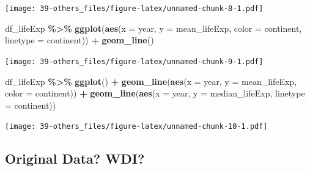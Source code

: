 \documentclass[
  xelatex, ja=standard]{bxjsbook}
\newenvironment{Shaded}{\begin{snugshade}}{\end{snugshade}}
\newcommand{\AttributeTok}[1]{\textcolor[rgb]{0.13,0.29,0.53}{#1}}
\newcommand{\FunctionTok}[1]{\textcolor[rgb]{0.13,0.29,0.53}{\textbf{#1}}}
\newcommand{\NormalTok}[1]{#1}
\newcommand{\SpecialCharTok}[1]{\textcolor[rgb]{0.81,0.36,0.00}{\textbf{#1}}}
\theoremstyle{definition}
\theoremstyle{definition}
\theoremstyle{definition}
\theoremstyle{definition}
\theoremstyle{remark}
\begin{document}
\texttt{[image: 39-others\_files/figure-latex/unnamed-chunk-8-1.pdf]}

\begin{Shaded}
\begin{Highlighting}[]
\NormalTok{df\_lifeExp }\SpecialCharTok{\%\textgreater{}\%} \FunctionTok{ggplot}\NormalTok{(}\FunctionTok{aes}\NormalTok{(}\AttributeTok{x =}\NormalTok{ year, }\AttributeTok{y =}\NormalTok{ mean\_lifeExp, }\AttributeTok{color =}\NormalTok{ continent, }\AttributeTok{linetype =}\NormalTok{ continent)) }\SpecialCharTok{+}
  \FunctionTok{geom\_line}\NormalTok{()}
\end{Highlighting}
\end{Shaded}

\texttt{[image: 39-others\_files/figure-latex/unnamed-chunk-9-1.pdf]}

\begin{Shaded}
\begin{Highlighting}[]
\NormalTok{df\_lifeExp }\SpecialCharTok{\%\textgreater{}\%} \FunctionTok{ggplot}\NormalTok{() }\SpecialCharTok{+}
  \FunctionTok{geom\_line}\NormalTok{(}\FunctionTok{aes}\NormalTok{(}\AttributeTok{x =}\NormalTok{ year, }\AttributeTok{y =}\NormalTok{ mean\_lifeExp, }\AttributeTok{color =}\NormalTok{ continent)) }\SpecialCharTok{+} 
  \FunctionTok{geom\_line}\NormalTok{(}\FunctionTok{aes}\NormalTok{(}\AttributeTok{x =}\NormalTok{ year, }\AttributeTok{y =}\NormalTok{ median\_lifeExp, }\AttributeTok{linetype =}\NormalTok{ continent))}
\end{Highlighting}
\end{Shaded}

\texttt{[image: 39-others\_files/figure-latex/unnamed-chunk-10-1.pdf]}

\hypertarget{original-data-wdi}{%
\subsection{Original Data? WDI?}\label{original-data-wdi}}
\end{document}
